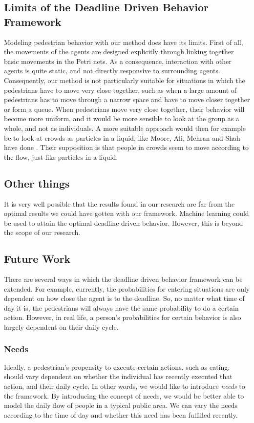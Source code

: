\documentclass[11pt]{book}
\begin{document}
\subsection{Limits of the Deadline Driven Behavior Framework}
Modeling pedestrian behavior with our method does have its limits. First of all, the movements of the agents are designed explicitly through linking together basic movements in the Petri nets. As a consequence, interaction with other agents is quite static, and not directly responsive to surrounding agents. Consequently, our method is not particularly suitable for situations in which the pedestrians have to move very close together, such as when a large amount of pedestrians has to move through a narrow space and have to move closer together or form a queue. When pedestrians move very close together, their behavior will become more uniform, and it would be more sensible to look at the group as a whole, and not as individuals. A more suitable approach would then for example be to look at crowds as particles in a liquid, like Moore, Ali, Mehran and Shah have done \cite{Moore:2011:VCS:2043174.2043192}. Their supposition is that people in crowds seem to move according to the flow, just like particles in a liquid.

\subsection{Other things}
It is very well possible that the results found in our research are far from the optimal results we could have gotten with our framework.  Machine learning could be used to attain the optimal deadline driven behavior. However, this is beyond the scope of our research.


\subsection{Future Work}
There are several ways in which the deadline driven behavior framework can be extended. For example, currently, the probabilities for entering situations are only dependent on how close the agent is to the deadline. So, no matter what time of day it is, the pedestrians will always have the same probability to do a certain action. However, in real life, a person's probabilities for certain behavior is also largely dependent on their daily cycle.

\subsubsection{Needs}
Ideally, a pedestrian's propensity to execute certain actions, such as eating, should vary dependent on whether the individual has recently executed that action, and their daily cycle. In other words, we would like to introduce \emph{needs} to the framework. By introducing the concept of needs, we would be better able to model the daily flow of people in a typical public area. We can vary the needs according to the time of day and whether this need has been fulfilled recently.
\end{document}
